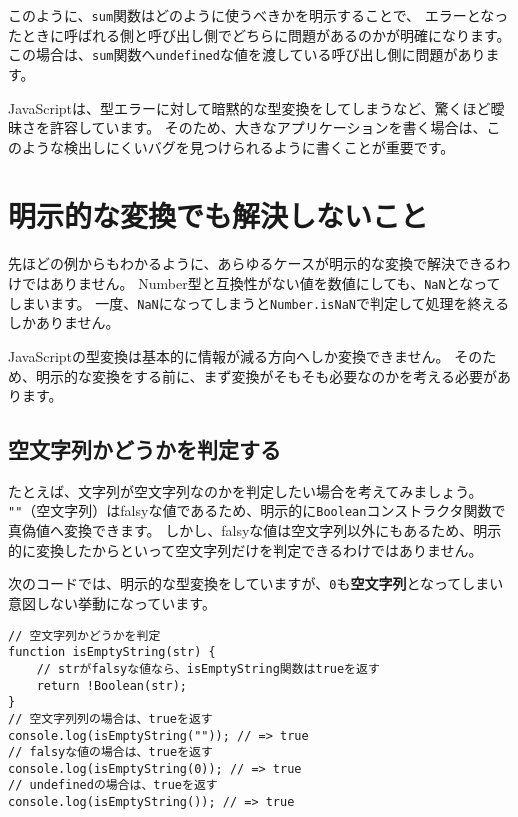 このように、\texttt{sum}関数はどのように使うべきかを明示することで、
エラーとなったときに呼ばれる側と呼び出し側でどちらに問題があるのかが明確になります。
この場合は、\texttt{sum}関数へ\texttt{undefined}な値を渡している呼び出し側に問題があります。

JavaScriptは、型エラーに対して暗黙的な型変換をしてしまうなど、驚くほど曖昧さを許容しています。
そのため、大きなアプリケーションを書く場合は、このような検出しにくいバグを見つけられるように書くことが重要です。

\hypertarget{unsolved-problem}{%
\section{明示的な変換でも解決しないこと}\label{unsolved-problem}}

先ほどの例からもわかるように、あらゆるケースが明示的な変換で解決できるわけではありません。
Number型と互換性がない値を数値にしても、\texttt{NaN}となってしまいます。
一度、\texttt{NaN}になってしまうと\texttt{Number.isNaN}で判定して処理を終えるしかありません。

JavaScriptの型変換は基本的に情報が減る方向へしか変換できません。
そのため、明示的な変換をする前に、まず変換がそもそも必要なのかを考える必要があります。

\hypertarget{judge-empty-string}{%
\subsection{空文字列かどうかを判定する}\label{judge-empty-string}}

たとえば、文字列が空文字列なのかを判定したい場合を考えてみましょう。
\texttt{""}（空文字列）はfalsyな値であるため、明示的に\texttt{Boolean}コンストラクタ関数で真偽値へ変換できます。
しかし、falsyな値は空文字列以外にもあるため、明示的に変換したからといって空文字列だけを判定できるわけではありません。

次のコードでは、明示的な型変換をしていますが、\texttt{0}も\textbf{空文字列}となってしまい意図しない挙動になっています。

\begin{lstlisting}
// 空文字列かどうかを判定
function isEmptyString(str) {
    // strがfalsyな値なら、isEmptyString関数はtrueを返す
    return !Boolean(str);
}
// 空文字列列の場合は、trueを返す
console.log(isEmptyString("")); // => true
// falsyな値の場合は、trueを返す
console.log(isEmptyString(0)); // => true
// undefinedの場合は、trueを返す
console.log(isEmptyString()); // => true
\end{lstlisting}

